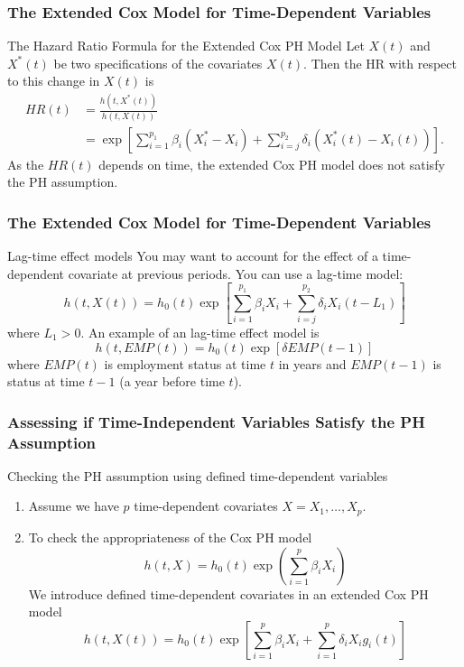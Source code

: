 \documentclass{beamer}
\theoremstyle{definition}
\begin{document}
\begin{frame}
\frametitle{The Extended Cox Model for Time-Dependent Variables}
\begin{block}{The Hazard Ratio Formula for the Extended Cox PH Model}
Let $X(t)$ and $X^*(t)$ be two specifications of the covariates $X(t)$. Then the HR with respect to this change in $X(t)$ is
\begin{align*}
HR(t) &= \frac{h(t,X^*(t))}{h(t,X(t))} \\
& = \exp\left[\sum_{i=1}^{p_1} \beta_i(X^*_i - X_i) + \sum_{i=j}^{p_2} \delta_i(X^*_i(t) - X_i(t))\right].
\end{align*}
As the $HR(t)$ depends on time, the extended Cox PH model does not satisfy the PH assumption.
\end{block}
\end{frame}


\begin{frame}
\frametitle{The Extended Cox Model for Time-Dependent Variables}
\begin{block}{Lag-time effect models}
You may want to account for the effect of a time-dependent covariate at previous periods. You can use a lag-time model:
\[
h(t,X(t)) = h_0(t) \exp\left[\sum_{i=1}^{p_1} \beta_i X_i + \sum_{i=j}^{p_2} \delta_i X_i(t-L_1)\right]
\]
where $L_1>0$.
An example of an lag-time effect model is
\[
h(t,EMP(t)) = h_0(t)\exp[\delta EMP(t-1)]
\]
where $EMP(t)$ is employment status at time $t$ in years and $EMP(t-1)$ is status at time $t-1$ (a year before time $t$).
\end{block}
\end{frame}

\begin{frame}
\frametitle{Assessing if Time-Independent Variables Satisfy the PH Assumption}
\begin{block}{Checking the PH assumption using defined time-dependent variables}
\begin{enumerate}
\item Assume we have $p$ time-dependent covariates $X=X_1,\ldots,X_p$.
\item To check the appropriateness of the Cox PH model
\begin{equation} \label{reducedCPH}
h(t,X) = h_0(t)\exp\left(\sum_{i=1}^p \beta_i X_i \right)
\end{equation}
We introduce defined time-dependent covariates in an extended Cox PH model
\begin{equation} \label{fullintCPH}
h(t,X(t)) = h_0(t) \exp\left[\sum_{i=1}^p \beta_i X_i + \sum_{i=1}^p \delta_i X_i g_i(t)\right]
\end{equation}
\end{enumerate}
\end{block}
\end{frame}
\end{document}
